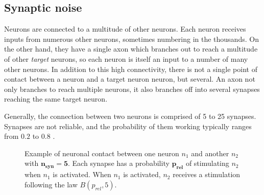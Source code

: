 \documentclass[journal]{IEEEtran}
\begin{document}
\subsection{Synaptic noise}

Neurons are connected to a multitude of other neurons. Each neuron receives inputs from numerous other neurons, sometimes numbering in the thousands. On the other hand, they have a single axon which branches out to reach a multitude of other \emph{target} neurons, so each neuron is itself an input to a number of many other neurons. In addition to this high connectivity, there is not a single point of contact between a neuron and a target neuron neuron, but several. An axon not only branches to reach multiple neurons, it also branches off into several synapses reaching the same target neuron. 

Generally, the connection between two neurons is comprised of 5 to 25 synapses\cite{branco2009probability}. Synapses are not reliable\cite{branco2009probability,allen1994evaluation}, and the probability of them working typically ranges from $0.2$ to $0.8$ \cite{branco2009probability}. 

\begin{figure}

\caption{Example of neuronal contact between one neuron $n_1$ and another $n_2$ with $\mathbf{n_{syn} = 5}$. Each synapse has a probability $\mathbf{p_{rel}}$ of stimulating $n_2$ when $n_1$ is activated. When $n_1$ is activated, $n_2$ receives a stimulation following the law $B(p_{rel}, 5)$.}
\label{fig:synmodel}
\end{figure}
\end{document}

